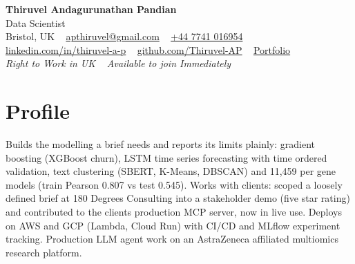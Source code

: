 \documentclass[a4paper,11pt]{article}
\begin{document}
\begin{center}
  {\fontsize{22}{26}\selectfont\bfseries\color{navy} Thiruvel Andagurunathan Pandian}\\[4pt]
  {\fontsize{12}{14}\selectfont\color{navy} Data Scientist}\\[4pt]
  {\small
  Bristol, UK\nobreak\ \,\textperiodcentered\, \href{mailto:apthiruvel@gmail.com}{apthiruvel@gmail.com}\nobreak\ \,\textperiodcentered\, \href{tel:+447741016954}{+44 7741 016954}\nobreak\ \,\textperiodcentered\, \href{https://www.linkedin.com/in/thiruvel-a-p/}{linkedin.com/in/thiruvel-a-p}\nobreak\ \,\textperiodcentered\, \href{https://github.com/Thiruvel-AP}{github.com/Thiruvel-AP}\nobreak\ \,\textperiodcentered\, \href{https://thiruvel-ap.github.io/PersonalPortfolio/}{Portfolio}}\\[3pt]
  {\small\itshape\color{muted} Right to Work in UK\nobreak\ \,\textperiodcentered\, Available to join Immediately}

\end{center}

\section{Profile}
Builds the modelling a brief needs and reports its limits plainly: gradient boosting (XGBoost churn), LSTM time series forecasting with time ordered validation, text clustering (SBERT, K-Means, DBSCAN) and 11,459 per gene models (train Pearson 0.807 vs test 0.545). Works with clients: scoped a loosely defined brief at 180 Degrees Consulting into a stakeholder demo (five star rating) and contributed to the client\textquotesingle{}s production MCP server, now in live use. Deploys on AWS and GCP (Lambda, Cloud Run) with CI/CD and MLflow experiment tracking. Production LLM agent work on an AstraZeneca affiliated multiomics research platform.
\end{document}
